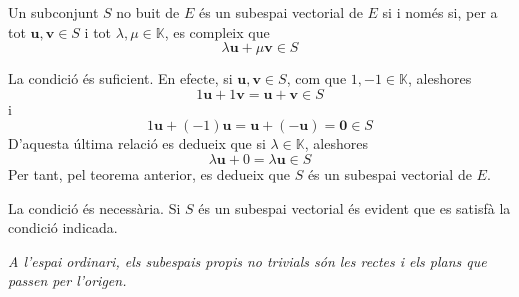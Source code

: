 \begin{teorema}
Un subconjunt $S$ no buit de $E$ és un subespai vectorial
de $E$ si i només si, per a tot $\mathbf{u},\mathbf{v}\in S$ i
tot $\lambda ,\mu \in \mathbb{K}$, es compleix que 
\begin{equation*}
\lambda \mathbf{u}+\mu \mathbf{v}\in S
\end{equation*}

\end{teorema}
\begin{prova}
La condició és suficient. En efecte, si $\mathbf{u,v}\in S$, com que $1,-1\in \mathbb{K}$, aleshores 
\begin{equation*}
1\mathbf{u}+1\mathbf{v}=\mathbf{u}+\mathbf{v}\in S
\end{equation*}%
i 
\begin{equation*}
1\mathbf{u}+(-1)\mathbf{u}=\mathbf{u}+(-\mathbf{u})=\mathbf{0}\in S
\end{equation*}%
D'aquesta última relació es dedueix que si $\lambda \in \mathbb{K}$,
aleshores 
\begin{equation*}
\lambda \mathbf{u}+0=\lambda \mathbf{u}\in S
\end{equation*}%
Per tant, pel teorema anterior, es dedueix que $S$ és un subespai
vectorial de $E$.

La condició és necessària. Si $S$ és un subespai vectorial és evident
que es satisfà la condició indicada.
\end{prova}

\begin{center}
%

{\small\itshape A l'espai ordinari, els subespais propis no trivials són les rectes i els plans que passen per l'origen.}
\end{center}

